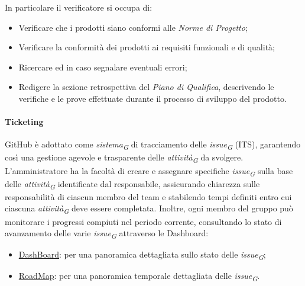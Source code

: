 In particolare il verificatore si occupa di:
\begin{itemize}
	\item Verificare che i prodotti siano conformi alle \textit{Norme di Progetto};
	\item Verificare la conformità dei prodotti ai requisiti funzionali e di qualità;
	\item Ricercare ed in caso segnalare eventuali errori;
	\item Redigere la sezione retrospettiva del \textit{Piano di Qualifica}, descrivendo le verifiche e le prove effettuate durante il processo di sviluppo del prodotto.
\end{itemize}

\hypertarget{par:ticketing}{\paragraph{Ticketing}}
GitHub è adottato come \textit{sistema}\textsubscript{\textit{G}} di tracciamento delle \textit{issue}\textsubscript{\textit{G}} (ITS), garantendo così una gestione agevole e trasparente delle \textit{attività}\textsubscript{\textit{G}} da svolgere. \\
L'amministratore ha la facoltà di creare e assegnare specifiche \textit{issue}\textsubscript{\textit{G}} sulla base delle \textit{attività}\textsubscript{\textit{G}} identificate dal responsabile, assicurando chiarezza sulle responsabilità di ciascun membro del team e stabilendo tempi definiti entro cui ciascuna \textit{attività}\textsubscript{\textit{G}} deve essere completata. Inoltre, ogni membro del gruppo può monitorare i progressi compiuti nel periodo corrente, consultando lo stato di avanzamento delle varie \textit{issue}\textsubscript{\textit{G}} attraverso le Dashboard:
\begin{itemize}
		\item \href{https://github.com/orgs/ByteOps-swe/projects/1}{DashBoard}: per una panoramica dettagliata sullo stato delle \textit{issue}\textsubscript{\textit{G}};
		\item \href{https://github.com/orgs/ByteOps-swe/projects/3}{RoadMap}: per una panoramica temporale dettagliata delle \textit{issue}\textsubscript{\textit{G}}.
\end{itemize}


